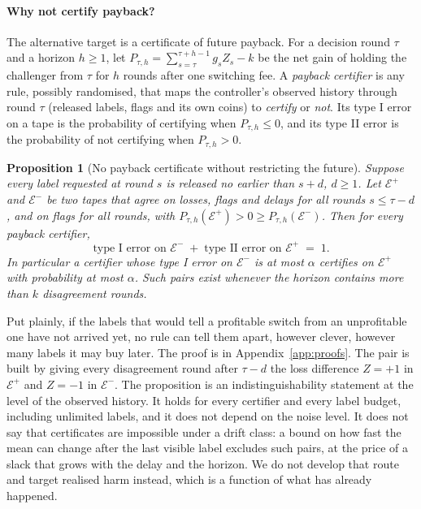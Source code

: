 \documentclass[10pt]{article}
\theoremstyle{plain}
\newtheorem{proposition}{Proposition}
\theoremstyle{definition}
\begin{document}
\paragraph{Why not certify payback?}
The alternative target is a certificate of future payback. For a decision round $\tau$ and a horizon $h\ge1$, let $P_{\tau,h}=\sum_{s=\tau}^{\tau+h-1}g_sZ_s-k$ be the net gain of holding the challenger from $\tau$ for $h$ rounds after one switching fee. A \emph{payback certifier} is any rule, possibly randomised, that maps the controller's observed history through round $\tau$ (released labels, flags and its own coins) to \emph{certify} or \emph{not}. Its type I error on a tape is the probability of certifying when $P_{\tau,h}\le0$, and its type II error is the probability of not certifying when $P_{\tau,h}>0$.

\begin{proposition}[No payback certificate without restricting the future]\label{prop:nocert}
Suppose every label requested at round $s$ is released no earlier than $s+d$, $d\ge1$. Let $\mathcal E^+$ and $\mathcal E^-$ be two tapes that agree on losses, flags and delays for all rounds $s\le\tau-d$, and on flags for all rounds, with $P_{\tau,h}(\mathcal E^+)>0\ge P_{\tau,h}(\mathcal E^-)$. Then for every payback certifier,
\[
\text{type I error on }\mathcal E^-\;+\;\text{type II error on }\mathcal E^+\;=\;1 .
\]
In particular a certifier whose type I error on $\mathcal E^-$ is at most $\alpha$ certifies on $\mathcal E^+$ with probability at most $\alpha$. Such pairs exist whenever the horizon contains more than $k$ disagreement rounds.
\end{proposition}
Put plainly, if the labels that would tell a profitable switch from an unprofitable one have not arrived yet, no rule can tell them apart, however clever, however many labels it may buy later. The proof is in Appendix~\ref{app:proofs}. The pair is built by giving every disagreement round after $\tau-d$ the loss difference $Z=+1$ in $\mathcal E^+$ and $Z=-1$ in $\mathcal E^-$. The proposition is an indistinguishability statement at the level of the observed history. It holds for every certifier and every label budget, including unlimited labels, and it does not depend on the noise level. It does not say that certificates are impossible under a drift class: a bound on how fast the mean can change after the last visible label excludes such pairs, at the price of a slack that grows with the delay and the horizon. We do not develop that route and target realised harm instead, which is a function of what has already happened.
\end{document}
